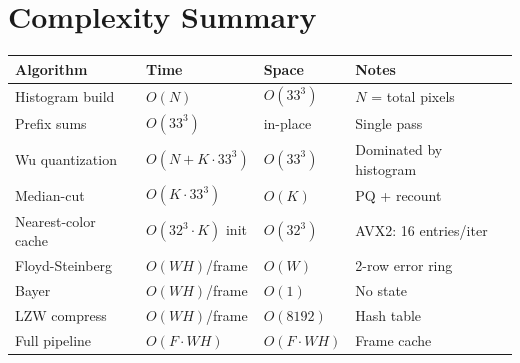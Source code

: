 \documentclass[11pt,a4paper]{article}
\begin{document}
\section{Complexity Summary}

\begin{center}
\begin{tabular}{@{}llll@{}}
\toprule
  Algorithm & Time & Space & Notes \\
\midrule
  Histogram build &
    $O(N)$ & $O(33^3)$ &
    $N$ = total pixels \\
  Prefix sums &
    $O(33^3)$ & in-place &
    Single pass \\
  Wu quantization &
    $O(N + K \cdot 33^3)$ & $O(33^3)$ &
    Dominated by histogram \\
  Median-cut &
    $O(K \cdot 33^3)$ & $O(K)$ &
    PQ + recount \\
  Nearest-color cache &
    $O(32^3 \cdot K)$ init & $O(32^3)$ &
    AVX2: 16 entries/iter \\
  Floyd-Steinberg &
    $O(WH)$/frame & $O(W)$ &
    2-row error ring \\
  Bayer &
    $O(WH)$/frame & $O(1)$ &
    No state \\
  LZW compress &
    $O(WH)$/frame & $O(8192)$ &
    Hash table \\
  Full pipeline &
    $O(F \cdot WH)$ & $O(F \cdot WH)$ &
    Frame cache \\
\bottomrule
\end{tabular}
\end{center}
\end{document}
